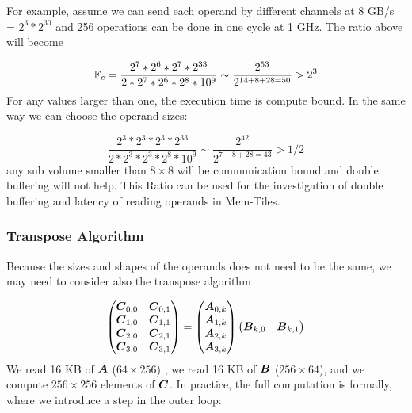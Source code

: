 \documentclass[conference]{IEEEtran}
\begin{document}
For example, assume we can send each operand by different channels at
8 GB/s = $2^3 *2^{30}$ and 256 operations can be done in one cycle at
1 GHz. The ratio above will become

\[
\mathbb{F}_c = \frac{2^7 * 2^6 * 2^7 * 2^{33}} { 2* 2^7 * 2^6* 2^8 *10^9} \sim \frac{2^{53}}{2^{14+8+28=50}} > 2^3  
\]
For any values larger than one, the execution time is compute
bound. In the same way we can choose the operand sizes:

\[
\frac{2^3 * 2^3 * 2^3 * 2^{33}} { 2* 2^3 * 2^3* 2^8 *10^9} \sim \frac{2^{42}}{2^{7+8+28=43}} >1/2    
\]
any sub volume smaller than $8 \times 8$ will be communication bound
and double buffering will not help. This Ratio can be used for the
investigation of double buffering and latency of reading operands in
Mem-Tiles.

\subsubsection{Transpose Algorithm}
Because the sizes and shapes of the operands does not need to be the
same, we may need to consider also the transpose algorithm

{\small \begin{equation}
  \label{eq:gemmB}
  \begin{pmatrix}
    \Vc{C}_{0,0}  & \Vc{C}_{0,1}  \\
    \Vc{C}_{1,0}  & \Vc{C}_{1,1}    \\
    \Vc{C}_{2,0}  & \Vc{C}_{2,1}  \\
    \Vc{C}_{3,0}  & \Vc{C}_{3,1} \\
  \end{pmatrix}    =
  \begin{pmatrix}
    \Vc{A}_{0,k}  \\
    \Vc{A}_{1,k}  \\
    \Vc{A}_{2,k}  \\
    \Vc{A}_{3,k}  \\
  \end{pmatrix}  
  \begin{pmatrix}
    \Vc{B}_{k,0}  &  \Vc{B}_{k,1}  \\
  \end{pmatrix}    
\end{equation}
} We read 16 KB of ${\boldsymbol A}$ ($64 \times 256$) , we read 16 KB of
${\boldsymbol B}$ ($256 \times 64$), and we compute $256 \times 256$ elements
of ${\boldsymbol C}$. In practice, the full computation is formally, where we
introduce a step in the outer loop: 
\end{document}
